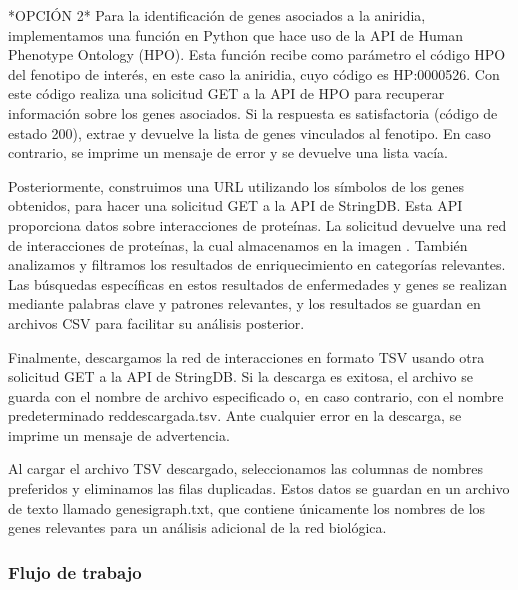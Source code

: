 *OPCIÓN 2*
Para la identificación de genes asociados a la aniridia, implementamos una función en Python que hace uso de la API de Human Phenotype Ontology (HPO). Esta función recibe como parámetro el código HPO del fenotipo de interés, en este caso la aniridia, cuyo código es HP:0000526. Con este código realiza una solicitud GET a la API de HPO para recuperar información sobre los genes asociados. Si la respuesta es satisfactoria (código de estado 200), extrae y devuelve la lista de genes vinculados al fenotipo. En caso contrario, se imprime un mensaje de error y se devuelve una lista vacía.

Posteriormente, construimos una URL utilizando los símbolos de los genes obtenidos, para hacer una solicitud GET a la API de StringDB. Esta API proporciona datos sobre interacciones de proteínas. La solicitud devuelve una red de interacciones de proteínas, la cual almacenamos en la imagen .
También analizamos y filtramos los resultados de enriquecimiento en categorías relevantes. Las búsquedas específicas en estos resultados de enfermedades y genes se realizan mediante palabras clave y patrones relevantes, y los resultados se guardan en archivos CSV para facilitar su análisis posterior.

Finalmente, descargamos la red de interacciones en formato TSV usando otra solicitud GET a la API de StringDB. Si la descarga es exitosa, el archivo se guarda con el nombre de archivo especificado o, en caso contrario, con el nombre predeterminado reddescargada.tsv. Ante cualquier error en la descarga, se imprime un mensaje de advertencia.

Al cargar el archivo TSV descargado, seleccionamos las columnas de nombres preferidos y eliminamos las filas duplicadas. Estos datos se guardan en un archivo de texto llamado genesigraph.txt, que contiene únicamente los nombres de los genes relevantes para un análisis adicional de la red biológica.

\subsubsection{Flujo de trabajo}


